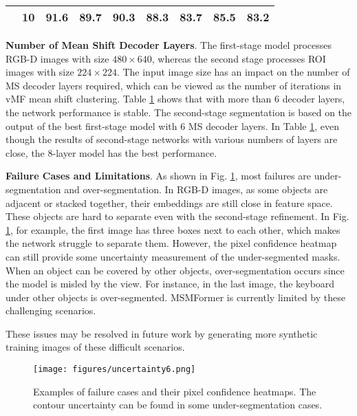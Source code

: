\documentclass[letterpaper, 10 pt, conference]{ieeeconf}
\begin{document}
\begin{table}
{\begin{tabular}{|c|c|ccccccc|}
                              & 10                                                                                 & 91.6          & 89.7          & \multicolumn{1}{c|}{90.3}          & 88.3          & 83.7          & \multicolumn{1}{c|}{85.5}          & 83.2          \\ \hline
\end{tabular}
  }
  \label{2dec}
\vspace{-4mm}
\end{table}

\textbf{Number of Mean Shift Decoder Layers}. The first-stage model processes RGB-D images with size $480\times640$, whereas the second stage processes ROI images with size $224\times224$. The input image size has an impact on the number of MS decoder layers required, which can be viewed as the number of iterations in vMF mean shift clustering. Table \ref{2dec} shows that with more than 6 decoder layers, the network performance is stable. The second-stage segmentation is based on the output of the best first-stage model with 6 MS decoder layers. In Table \ref{2dec}, even though the results of second-stage networks with various numbers of layers are close, the 8-layer model has the best performance.

\textbf{Failure Cases and Limitations}. As shown in Fig. \ref{fig:failure}, most failures are under-segmentation and over-segmentation. In RGB-D images, as some objects are adjacent or stacked together, their embeddings are still close in feature space. These objects are hard to separate even with the second-stage refinement. In Fig. \ref{fig:failure}, for example, the first image has three boxes next to each other, which makes the network struggle to separate them. However, the pixel confidence heatmap can still provide some uncertainty measurement of the under-segmented masks. When an object can be covered by other objects, over-segmentation occurs since the model is misled by the view. For instance, in the last image, the keyboard under other objects is over-segmented. MSMFormer is currently limited by these challenging scenarios.


These issues may be resolved in future work by generating more synthetic training images of these difficult scenarios.

\begin{figure}
    \centering
\texttt{[image: figures/uncertainty6.png]}
    \vspace{-4mm}
    \caption{Examples of failure cases and their pixel confidence heatmaps. The contour uncertainty can be found in some under-segmentation cases.}
    \label{fig:failure}
    \vspace{-4mm}
\end{figure}
\end{document}
